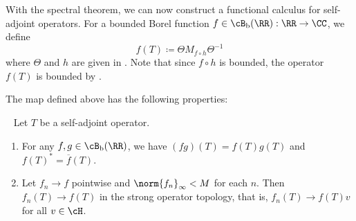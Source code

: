 \documentclass[oneside,reqno,letterpaper]{amsart}
\begin{document}
With the spectral theorem, we can now construct a functional calculus for self-adjoint operators. 
For a bounded Borel function \(f \in \cB_\mathrm{b}(\RR): \RR \to \CC\), we define 
\[
  f(T) \coloneqq \Theta M_{f \circ h} \Theta^{-1} 
\] 
where \(\Theta\) and \(h\) are given in . 
Note that since \(f \circ h\) is bounded, the operator \(f(T)\) is bounded by . 

The map defined above has the following properties:
\begin{proposition}~
\label{thm:self-adjoint-FC}
  Let \(T\) be a self-adjoint operator. 
  \begin{enumerate}[label=(\alph*)]
    \item\label{enum:self-adjoint-FC:*homomorphism}
      For any \(f, g \in \cB_{\mathrm{b}}(\RR)\), we have \((fg)(T) = f(T)g(T)\) and \(f(T)^* = \overline{f}(T)\). 
    \item\label{enum:self-adjoint-FC:stronglim}
      Let \(f_{n} \to f\) pointwise and \(\norm{f_{n}}_{\infty} < M\) for each \(n\).
      Then \(f_{n}(T) \to f(T)\) in the strong operator topology, that is, \(f_{n}(T) \to f(T) v\) for all \(v \in \cH\).
  \end{enumerate}
\end{proposition}
\end{document}

